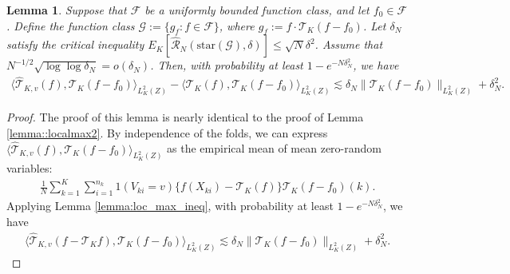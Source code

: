 \documentclass[11pt]{article}
\theoremstyle{plain}
\newtheorem{lemma}{Lemma}
\theoremstyle{definition}
\theoremstyle{remark}
\theoremstyle{definition}
\begin{document}
\begin{lemma}
  \label{lemma::localmax3} Suppose that $\mathcal{F}$ be a uniformly bounded function class, and let $f_0 \in \mathcal{F}$. Define the function class $\mathcal{G} := \{g_f: f \in \mathcal{F} \}$, where $g_f:= f \cdot \mathcal{T}_{K}(f - f_0)$. Let $\delta_N$ satisfy the critical inequality $E_K[\widehat{\mathcal{R}}_N(\text{star}(\mathcal{G}), \delta)]\leq \sqrt{N} \delta^2$. Assume that $ N^{-1/2} \sqrt{\log \log \delta_{N}} =  o(\delta_{N})$. Then,  with probability at least $1 - e^{-N\delta_N^2}$, we have
\begin{align*}
       \langle  \widehat{\mathcal{T}}_{K,v}(f), \mathcal{T}_{K}(f - f_0) \rangle_{L^2_K(Z)} -  \langle  \mathcal{T}_{K}(f), \mathcal{T}_{K}(f - f_0) \rangle_{L^2_K(Z)}  \lesssim \delta_N   \|\mathcal{T}_{K}(f - f_0)\|_{L^2_K(Z)} + \delta_N^2 .
\end{align*} 
 
\end{lemma}
\begin{proof}
      The proof of this lemma is nearly identical to the proof of Lemma \ref{lemma::localmax2}. By independence of the folds, we can express \(  \langle  \widehat{\mathcal{T}}_{K,v}(f), \mathcal{T}_{K}(f - f_0) \rangle_{L^2_K(Z)} \) as the empirical mean of mean zero-random variables:
\begin{align*}
  \frac{1}{N} \sum_{k=1}^K \sum_{i=1}^{n_k} 1(V_{ki} = v)\{f(X_{ki}) - \mathcal{T}_{K}(f)\} \mathcal{T}_{K}(f - f_0)(k).
\end{align*}
Applying Lemma \ref{lemma:loc_max_ineq}, with probability at least $1 - e^{-N\delta_N^2}$, we have
\begin{align*}
 \langle  \widehat{\mathcal{T}}_{K,v}(f - \mathcal{T}_{K}f), \mathcal{T}_{K}(f - f_0) \rangle_{L^2_K(Z)}  \lesssim \delta_N   \|\mathcal{T}_{K}(f - f_0)\|_{L^2_K(Z)} + \delta_N^2 .
\end{align*} 


\end{proof}


 
\end{document}
